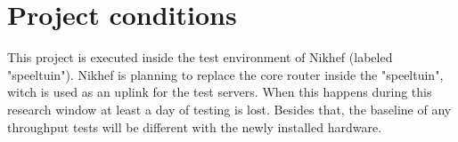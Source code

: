 \section{Project conditions}
This project is executed inside the test environment of Nikhef (labeled "speeltuin"). Nikhef is planning to replace the core router inside the "speeltuin", witch is used as an uplink for the test servers. When this happens during this research window at least a day of testing is lost. Besides that, the baseline of any throughput tests will be different with the newly installed hardware.   
